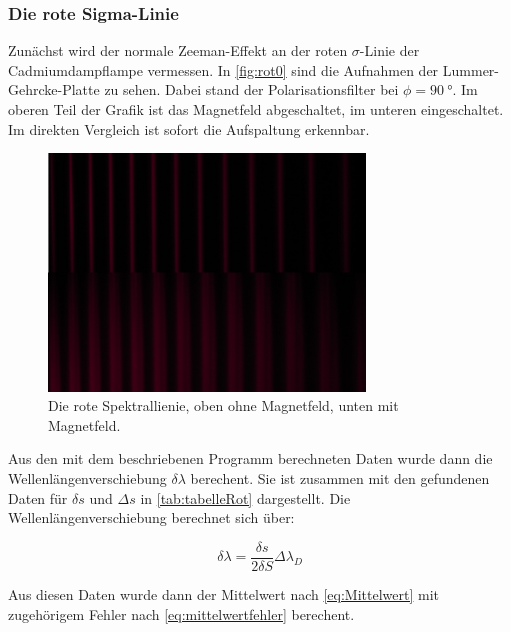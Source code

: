 \subsubsection{Die rote Sigma-Linie}
\label{sec:rot}
Zunächst wird der normale Zeeman-Effekt an der roten $\sigma$-Linie der Cadmiumdampflampe vermessen.
In \autoref{fig:rot0} sind die Aufnahmen der Lummer-Gehrcke-Platte zu sehen. Dabei stand der Polarisationsfilter
bei $\phi=\SI[]{90}[]{\degree}$. Im oberen Teil der Grafik ist das Magnetfeld abgeschaltet, im unteren eingeschaltet.
Im direkten Vergleich ist sofort die Aufspaltung erkennbar.
\begin{figure}
  \centering
  \includegraphics[width=0.75\textwidth]{content/grafiken/rot 0.JPG}
  \caption{Die rote Spektrallienie, oben ohne Magnetfeld, unten mit Magnetfeld.}
  \label{fig:rot0}
\end{figure}

Aus den mit dem beschriebenen Programm berechneten Daten wurde dann die Wellenlängenverschiebung $\delta \lambda$
berechent. Sie ist zusammen mit den gefundenen Daten für $\delta s$ und $\Delta s$ in \autoref{tab:tabelleRot}
dargestellt. Die Wellenlängenverschiebung berechnet sich über:

\begin{equation}
  \delta \lambda =\frac{\delta s}{2\delta S}\Delta \lambda_D
\end{equation}

Aus diesen Daten wurde dann der Mittelwert nach \autoref{eq:Mittelwert} mit zugehörigem Fehler nach
\autoref{eq:mittelwertfehler} berechent.

\FloatBarrier
\newpage
